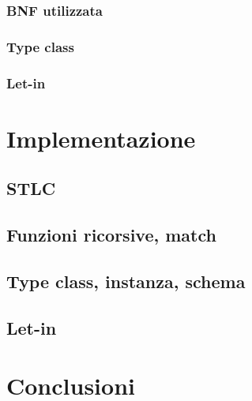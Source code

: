 \documentclass[12pt,a4paper,openright,twoside]{report}
\begin{document}
\subsection{BNF utilizzata}
\subsection{Type class}
\subsection{Let-in}

\clearpage{\pagestyle{empty}\cleardoublepage}	%


\chapter{Implementazione}		%

\lhead[\fancyplain{}{\bfseries\thepage}]{\fancyplain{}{\bfseries\rightmark}}	%


\section{STLC}

\section{Funzioni ricorsive, match}

\section{Type class, instanza, schema}

\section{Let-in}

\clearpage{\pagestyle{empty}\cleardoublepage}		%


\chapter{Conclusioni}		%

\end{document}
